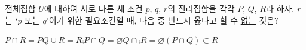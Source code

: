 전체집합 $U$에 대하여 서로 다른 세 조건 $p$, $q$, $r$의 진리집합을 각각 $P$, $Q$, $R$라 하자. $r$는 `$p$ 또는 $q$'이기 위한 필요조건일 때, 다음 중 반드시 옳다고 할 수 \underline{없는} 것은?
\begin{choicesii}{$P\cap R=P$}{$Q\cup R=R$}{$\comp{P}\cap Q=\varnothing$}{$Q\cap\comp{R}=\varnothing$}{$(P\cap Q)\subset R$}\end{choicesii}
